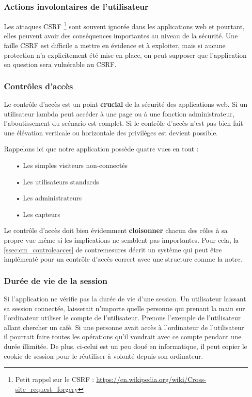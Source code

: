 \documentclass[12pt]{article}
\begin{document}
\subsubsection{Actions involontaires de l'utilisateur}

Les attaques CSRF \footnote{Petit rappel sur le CSRF : \url{https://en.wikipedia.org/wiki/Cross-site_request_forgery}} sont souvent ignorée dans les applications web et pourtant, elles peuvent avoir des conséquences importantes au niveau de la sécurité. Une faille CSRF est difficile a
mettre en évidence et à exploiter, mais si aucune protection n'a explicitement été mise en place, on peut supposer que l'application en question sera vulnérable au CSRF.

\subsubsection{Contrôles d'accès}

Le contrôle d'accès est un point \textbf{crucial} de la sécurité des applications web. Si un utilisateur lambda peut accéder à une page ou à une fonction administrateur, l'aboutissement du scénario est complet. Si le contrôle d'accès n'est pas bien fait une élévation verticale ou horizontale des privilèges est devient possible. 

Rappelons ici que notre application possède quatre vues en tout :

\begin{itemize}
\item[•] Les simples visiteurs non-connectés
\item[•] Les utilisateurs standards
\item[•] Les administrateurs
\item[•] Les capteurs
\end{itemize}

Le contrôle d'accès doit bien évidemment \textbf{cloisonner} chacun des rôles à sa propre vue même si les implications ne semblent pas importantes. Pour cela, la \autoref{ssec:cm_controleacces} de contremesures décrit un système qui peut être implémenté pour un contrôle d'accès correct avec une structure comme la notre.

\subsubsection{Durée de vie de la session}

Si l'application ne vérifie pas la durée de vie d'une session. Un utilisateur laissant sa session connectée, laisserait n'importe quelle personne qui prenant la main sur l'ordinateur utiliser le compte de l'utilisateur.
Prenons l'exemple de l'utilisateur allant chercher un café. Si une personne avait accès à l'ordinateur de l'utilisateur il pourrait faire toutes les opérations qu'il voudrait avec ce compte pendant une durée illimitée. De plus, ci-celui est un peu doué en informatique, il peut copier le cookie de session pour le réutiliser à volonté depuis son ordinateur.
\end{document}
